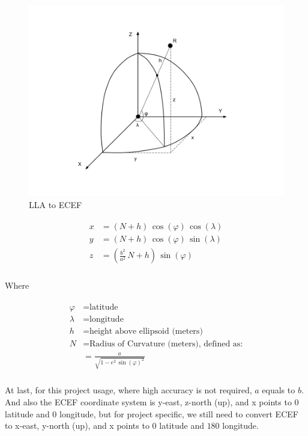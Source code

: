 \begin{figure}[H]
\centering
\includegraphics[width=\linewidth]{Figures/lla2ecef.png}
\decoRule
\caption[lla2ecef]{LLA to ECEF}
\end{figure}

\[
\begin{array}{lr}
\begin{aligned}
x &= (N + h)\,\cos(\varphi)\,\cos(\lambda)\\
y &= (N + h)\,\cos(\varphi)\,\sin(\lambda)\\
z &= (\frac{b^2}{a^2}\,N + h)\,\sin(\varphi)\\
\end{aligned}
\end{array}
\]

Where

\[
\begin{array}{lr}
\begin{aligned}
\varphi &= \text{latitude}\\
\lambda &= \text{longitude}\\
h &= \text{height above ellipsoid (meters)}\\
N &= \text{Radius of Curvature (meters), defined as:}\\
&= \frac{a}{\sqrt{1 - e^2\,\sin(\varphi)^2}}\\
\end{aligned}
\end{array}
\]

At last, for this project usage, where high accuracy is not required, $a$ equals to $b$. And also the ECEF coordinate system is y-east, z-north (up), and x points to $0$ latitude and $0$ longitude, but for project specific, we still need to convert ECEF to x-east, y-north (up), and x points to $0$ latitude and $180$ longitude.

